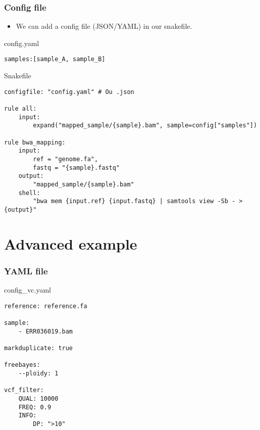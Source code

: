 \documentclass{beamer}
\begin{document}
\begin{frame}[fragile]
    \frametitle{Config file}
    \begin{itemize}
        \item We can add a config file (JSON/YAML) in our snakefile.
    \end{itemize}
    \begin{block}{config.yaml}
        \begin{lstlisting}
samples:[sample_A, sample_B]
        \end{lstlisting}
    \end{block}
    \begin{block}{Snakefile}
    \begin{lstlisting}
configfile: "config.yaml" # Ou .json

rule all:
    input:
        expand("mapped_sample/{sample}.bam", sample=config["samples"])

rule bwa_mapping:
    input:
        ref = "genome.fa",
        fastq = "{sample}.fastq"
    output:
        "mapped_sample/{sample}.bam"
    shell:
        "bwa mem {input.ref} {input.fastq} | samtools view -Sb - > {output}"
    \end{lstlisting}
    \end{block}
\end{frame}

\section{Advanced example}

\begin{frame}[fragile]
    \frametitle{YAML file}
    \begin{block}{config\_vc.yaml}
    \begin{lstlisting}
reference: reference.fa

sample: 
    - ERR036019.bam

markduplicate: true

freebayes:
    --ploidy: 1

vcf_filter:
    QUAL: 10000
    FREQ: 0.9
    INFO:
        DP: ">10"
    \end{lstlisting}
    \end{block}
\end{frame}
\end{document}
